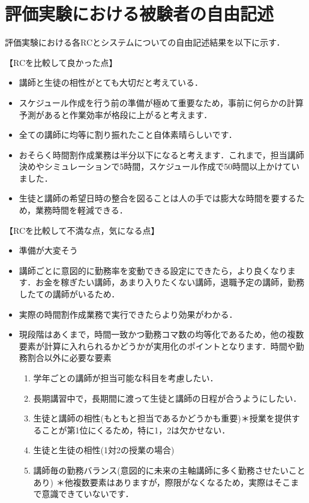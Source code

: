 \chapter{評価実験における被験者の自由記述}
評価実験における各RCとシステムについての自由記述結果を以下に示す．




【RCを比較して良かった点】
\begin{itemize}
  \item 講師と生徒の相性がとても大切だと考えている．
  \item スケジュール作成を行う前の準備が極めて重要なため，事前に何らかの計算予測があると作業効率が格段に上がると考えます．
  \item 全ての講師に均等に割り振れたこと自体素晴らしいです．
  \item おそらく時間割作成業務は半分以下になると考えます．これまで，担当講師決めやシミュレーションで5時間，スケジュール作成で50時間以上かけていました．
  \item 生徒と講師の希望日時の整合を図ることは人の手では膨大な時間を要するため，業務時間を軽減できる．
\end{itemize}

【RCを比較して不満な点，気になる点】
\begin{itemize}
  \item 準備が大変そう
  \item 講師ごとに意図的に勤務率を変動できる設定にできたら，より良くなります．お金を稼ぎたい講師，あまり入りたくない講師，退職予定の講師，勤務したての講師がいるため．
  \item 実際の時間割作成業務で実行できたらより効果がわかる．
  \item 現段階はあくまで，時間一致かつ勤務コマ数の均等化であるため，他の複数要素が計算に入れられるかどうかが実用化のポイントとなります．時間や勤務割合以外に必要な要素
  \begin{enumerate}
    \item 学年ごとの講師が担当可能な科目を考慮したい．
    \item 長期講習中で，長期間に渡って生徒と講師の日程が合うようにしたい．
    \item 生徒と講師の相性(もともと担当であるかどうかも重要)＊授業を提供することが第1位にくるため，特に1，2は欠かせない．
    \item 生徒と生徒の相性(1対2の授業の場合)
    \item 講師毎の勤務バランス(意図的に未来の主軸講師に多く勤務させたいことあり)
    ＊他複数要素はありますが，際限がなくなるため，実際はそこまで意識できていないです．
  \end{enumerate}
\end{itemize}

